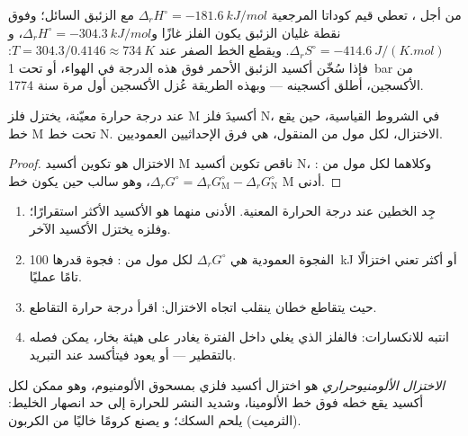 \begin{example}\label{ex:b2:ellingham:hgo}
من أجل ، تعطي قيم كوداتا المرجعية $\Delta_r H^\circ =
\qty{-181.6}{kJ/mol}$ مع الزئبق السائل؛ وفوق نقطة غليان الزئبق
يكون الفلز غازًا و$\Delta_r H^\circ = \qty{-304.3}{kJ/mol}$، و$\Delta_r
S^\circ = \qty{-414.6}{J/(K.mol)}$. ويقطع الخط الصفر عند
$T = 304.3/0.4146 \approx \qty{734}{K}$: فإذا سُخّن أكسيد الزئبق الأحمر فوق هذه الدرجة في الهواء،
أو تحت \qty{1}{bar} من الأكسجين، أطلق أكسجينه ---
وبهذه الطريقة عُزل الأكسجين أول مرة سنة 1774.
\end{example}

\begin{proposition}\label{prop:b2:ellingham:reduction}
عند درجة حرارة معيّنة، يختزل فلز M أكسيدَ فلز N، في
الشروط القياسية، حين يقع خط M تحت خط N.  الاختزال، لكل مول من  المنقول، هي
فرق الإحداثيين العموديين.
\end{proposition}

\begin{proof}
الاختزال هو تكوين أكسيد M ناقص تكوين أكسيد N، وكلاهما لكل
مول من : $\Delta_r G^\circ = \Delta_r G^\circ_{\mathrm M} - \Delta_r
G^\circ_{\mathrm N}$، وهو سالب حين يكون خط M أدنى.
\end{proof}

\begin{method}\label{met:b2:ellingham:read-ellingham}
\begin{enumerate}
  \item جِد الخطين عند درجة الحرارة المعنية. الأدنى منهما هو
        الأكسيد الأكثر استقرارًا؛ وفلزه يختزل الأكسيد الآخر.
  \item الفجوة العمودية هي $\Delta_r G^\circ$ لكل مول من : فجوة قدرها
        \qty{100}{kJ} أو أكثر تعني اختزالًا تامًا عمليًا.
  \item حيث يتقاطع خطان ينقلب اتجاه الاختزال: اقرأ
        درجة حرارة التقاطع.
  \item انتبه للانكسارات: فالفلز الذي يغلي داخل الفترة يغادر على هيئة
        بخار، يمكن فصله بالتقطير --- أو يعود فيتأكسد عند التبريد.
\end{enumerate}
\end{method}

\begin{definition}\label{def:b2:ellingham:aluminothermy}
\emph{الاختزال الألومنيوحراري} هو
اختزال أكسيد فلزي بمسحوق الألومنيوم، وهو ممكن لكل أكسيد يقع
خطه فوق خط الألومينا، وشديد النشر للحرارة إلى حد انصهار الخليط:
 (الثرميت) يلحم السكك؛ و يصنع كرومًا خاليًا من الكربون.
\end{definition}

